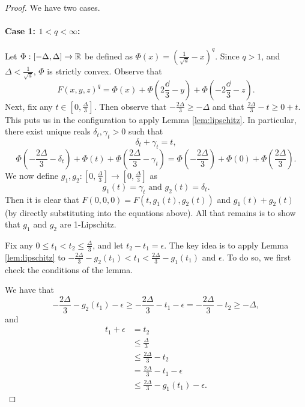 \begin{proof}
We have two cases.
\paragraph{Case 1: $1 < q < \infty$:} Let $\Phi: [-\Delta, \Delta] \to \mathbb R$ be defined as $\Phi(x) = (\frac{1}{\sqrt{d}} - x)^q$. Since $q > 1$, and $\Delta < \frac{1}{\sqrt{d}}$, $\Phi$ is strictly convex. Observe that $$F(x, y, z)^q = \Phi(x) + \Phi(2\frac{\dd}{3} - y) + \Phi(-2\frac{\dd}{3} - z).$$ Next, fix any $t \in [0, \frac{\Delta}{3}]$. Then observe that $-\frac{2\Delta}{3} \geq -\Delta$ and that $\frac{2\Delta}{3} - t \geq 0 + t$. This puts us in the configuration to apply Lemma \ref{lem:lipschitz}. In particular, there exist unique reals $\delta_t, \gamma_t > 0$ such that $$\delta_t + \gamma_t = t,$$ $$\Phi(-\frac{2\Delta}{3} - \delta_t) + \Phi(t) + \Phi(\frac{2\Delta}{3} - \gamma_t) = \Phi(-\frac{2\Delta}{3}) + \Phi(0) + \Phi(\frac{2\Delta}{3}).$$ We now define $g_1, g_2: [0, \frac{\Delta}{3}] \to [0, \frac{\Delta}{3}]$ as $$g_1(t) = \gamma_t\text{ and }g_2(t) = \delta_t.$$ Then it is clear that $F(0,0,0) = F(t, g_1(t), g_2(t))$ and $g_1(t) + g_2(t)$ (by directly substituting into the equations above). All that remains is to show that $g_1$ and $g_2$ are 1-Lipschitz. 

Fix any $0 \leq t_1 < t_2 \leq \frac{\Delta}{3}$, and let $t_2 - t_1 = \epsilon$. The key idea is to apply Lemma \ref{lem:lipschitz} to $-\frac{2\Delta}{3} - g_2(t_1)<  t_1 < \frac{2\Delta}{3} - g_1(t_1)$ and $\epsilon$. To do so, we first check the conditions of the lemma. 

We have that $$-\frac{2\Delta}{3} - g_2(t_1) - \epsilon \geq -\frac{2\Delta}{3} - t_1 - \epsilon = -\frac{2\Delta}{3} - t_2 \geq -\Delta,$$ and 
\begin{equation*}
\begin{split}
t_1 + \epsilon &= t_2 \\
&\leq \frac{\Delta}{3} \\
&\leq \frac{2\Delta}{3} - t_2 \\
&= \frac{2\Delta}{3} - t_1 - \epsilon \\
&\leq \frac{2\Delta}{3} - g_1(t_1) - \epsilon.
\end{split}
\end{equation*}


\end{proof}
